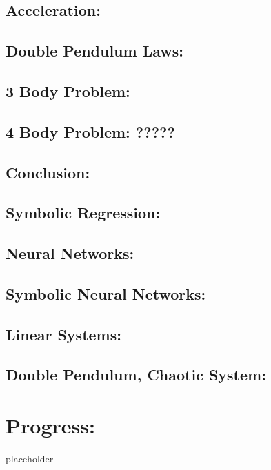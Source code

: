 \documentclass{article}
\begin{document}
\subsection{ Acceleration: }

\subsection{ Double Pendulum Laws: }

\subsection{ 3 Body Problem: }

\subsection{ 4 Body Problem: ?????}

\subsection{ Conclusion: }


\subsection{Symbolic Regression: }

\subsection{Neural Networks: }

\subsection{Symbolic Neural Networks: }

\subsection{Linear Systems: }

\subsection{Double Pendulum, Chaotic System: }

\section{Progress: }

placeholder 
\end{document}
